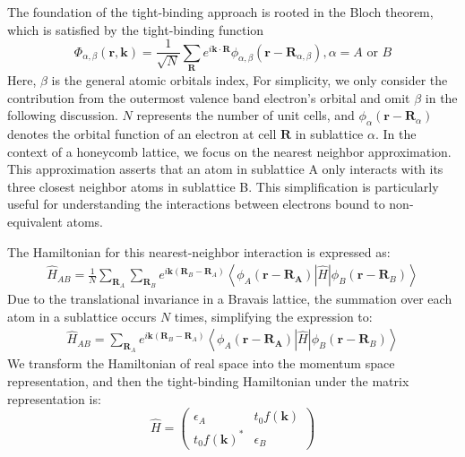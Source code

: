 The foundation of the tight-binding approach is rooted in the Bloch theorem, which is satisfied by the tight-binding function
\begin{equation}
	\Phi_{\alpha,\beta}(\mathbf{r}, \mathbf{k})=\frac{1}{\sqrt{N}} \sum_{\mathbf{R}} e^{i \mathbf{k}
			\cdot \mathbf{R}} \phi_{\alpha,\beta}\left(\mathbf{r}-\mathbf{R}_{\alpha,\beta}\right), \alpha=A \text { or } B
	\label{eqn:Bloch}
\end{equation}
Here, $\beta$ is the general atomic orbitals index,
For simplicity, we only consider the contribution from the outermost valence band electron's
orbital and omit $\beta$ in the following discussion. $N$ represents the number of unit cells, and $\phi_{\alpha}(\mathbf{r} - \mathbf{R}_{\alpha})$ denotes the orbital function of an electron at cell $\mathbf{R}$ in sublattice $\alpha$.
In the context of a honeycomb lattice, we focus on the nearest neighbor approximation. This approximation asserts that an atom in sublattice A only interacts with its three closest neighbor atoms in sublattice B. This simplification is particularly useful for understanding the interactions between electrons bound to non-equivalent atoms.

The Hamiltonian for this nearest-neighbor interaction is expressed as:
\begin{align}
	\hat{H}_{A B}=\frac{1}{N} \sum_{\mathbf{R}_{A}} \sum_{\mathbf{R}_{B}} e^{i \mathbf{k}\left(\mathbf{R}_{B}-\mathbf{R}_{A}\right)}\left\langle\phi_{A}\left(\mathbf{r}-\mathbf{R}_{\mathbf{A}}\right)|\hat H| \phi_{B}\left(\mathbf{r}-\mathbf{R}_{B}\right)\right\rangle
\end{align}
Due to the translational invariance in a Bravais lattice, the summation over each atom in a sublattice occurs $N$ times, simplifying the expression to:
\begin{align}
	\hat{H}_{A B}=\sum_{\mathbf{R}_{A}} e^{i \mathbf{k}\left(\mathbf{R}_{B}-\mathbf{R}_{A}\right)}\left\langle\phi_{A}\left(\mathbf{r}-\mathbf{R}_{\mathbf{A}}\right)|\hat{H}| \phi_{B}\left(\mathbf{r}-\mathbf{R}_{B}\right)\right\rangle
\end{align}
We transform the Hamiltonian of real space into the momentum space representation, and then the
tight-binding Hamiltonian under the matrix representation is:
\begin{equation}
	\hat{H} =\left(\begin{array}{cc}
			\epsilon_{A}            & t_{0} f(\mathbf{k}) \\
			t_{0} f(\mathbf{k})^{*} & \epsilon_{B}
		\end{array}\right)
	\label{eqn: TBh}
\end{equation}

